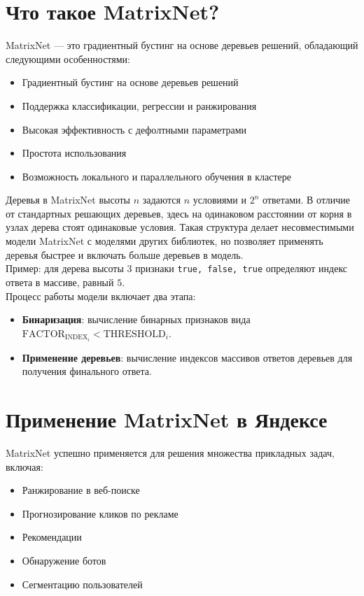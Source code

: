 \section{Что такое MatrixNet?}
MatrixNet — это градиентный бустинг на основе деревьев решений, обладающий следующими особенностями:
\begin{itemize}
    \item Градиентный бустинг на основе деревьев решений
    \item Поддержка классификации, регрессии и ранжирования
    \item Высокая эффективность с дефолтными параметрами
    \item Простота использования
    \item Возможность локального и параллельного обучения в кластере
\end{itemize}

Деревья в MatrixNet высоты $n$ задаются $n$ условиями и $2^n$ ответами. В отличие от стандартных решающих деревьев, здесь на одинаковом расстоянии от корня в узлах дерева стоят одинаковые условия. Такая структура делает несовместимыми модели MatrixNet с моделями других библиотек, но позволяет применять деревья быстрее и включать больше деревьев в модель.\\
Пример: для дерева высоты 3 признаки \texttt{true, false, true} определяют индекс ответа в массиве, равный $5$.\\
Процесс работы модели включает два этапа:
\begin{itemize}
    \item \textbf{Бинаризация}: вычисление бинарных признаков вида $\text{FACTOR}_{\text{INDEX}_i} < \text{THRESHOLD}_i$.
    \item \textbf{Применение деревьев}: вычисление индексов массивов ответов деревьев для получения финального ответа.
\end{itemize}

\section{Применение MatrixNet в Яндексе}
MatrixNet успешно применяется для решения множества прикладных задач, включая:
\begin{itemize}
    \item Ранжирование в веб-поиске
    \item Прогнозирование кликов по рекламе
    \item Рекомендации
    \item Обнаружение ботов
    \item Сегментацию пользователей
\end{itemize}


